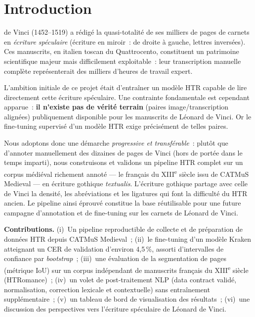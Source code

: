 \documentclass[10pt,journal,a4paper]{IEEEtran}
\begin{document}
\section{Introduction}
 de Vinci (1452--1519) a rédigé la quasi-totalité de
ses milliers de pages de carnets en \emph{écriture spéculaire} (écriture en
miroir~: de droite à gauche, lettres inversées). Ces manuscrits, en italien
toscan du Quattrocento, constituent un patrimoine scientifique majeur mais
difficilement exploitable~: leur transcription manuelle complète représenterait
des milliers d'heures de travail expert.

L'ambition initiale de ce projet était d'entraîner un modèle HTR capable de lire
directement cette écriture spéculaire. Une contrainte fondamentale est cependant
apparue~: \textbf{il n'existe pas de vérité terrain} (paires image/transcription
alignées) publiquement disponible pour les manuscrits de Léonard de Vinci. Or le
fine-tuning supervisé d'un modèle HTR exige précisément de telles paires.

Nous adoptons donc une démarche \emph{progressive et transférable}~: plutôt que
d'annoter manuellement des dizaines de pages de Vinci (hors de portée dans le
temps imparti), nous construisons et validons un pipeline HTR complet sur un
corpus médiéval richement annoté --- le français du XIII\textsuperscript{e}
siècle issu de CATMuS Medieval --- en écriture gothique \textit{textualis}.
L'écriture gothique partage avec celle de Vinci la densité, les abréviations et
les ligatures qui font la difficulté du HTR ancien. Le pipeline ainsi éprouvé
constitue la base réutilisable pour une future campagne d'annotation et de
fine-tuning sur les carnets de Léonard de Vinci.

\textbf{Contributions.} (i)~Un pipeline reproductible de collecte et de
préparation de données HTR depuis CATMuS Medieval~; (ii)~le fine-tuning d'un
modèle Kraken atteignant un CER de validation d'environ 4,5\,\%, assorti
d'intervalles de confiance par \textit{bootstrap}~; (iii)~une évaluation de la
segmentation de pages (métrique IoU) sur un corpus indépendant de manuscrits
français du XIII\textsuperscript{e} siècle (HTRomance)~; (iv)~un volet de
post-traitement NLP (data contract validé, normalisation, correction lexicale et
contextuelle) sans entraînement supplémentaire~; (v)~un tableau de bord de
visualisation des résultats~; (vi)~une discussion des perspectives vers
l'écriture spéculaire de Léonard de Vinci.
\end{document}
